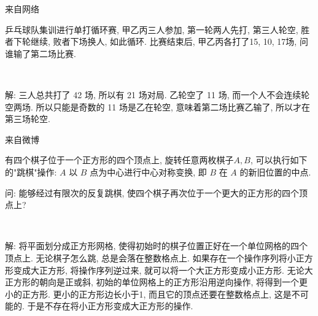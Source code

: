 \newpage
\noindent 来自网络

乒乓球队集训进行单打循环赛, 甲乙丙三人参加, 第一轮两人先打, 第三人轮空, 胜者下轮继续, 败者下场换人, 如此循环. 比赛结束后, 甲乙丙各打了15, 10, 17场, 问谁输了第二场比赛.

~

解: 三人总共打了 42 场, 所以有 21 场对局. 乙轮空了 11 场, 而一个人不会连续轮空两场. 所以只能是奇数的 11 场是乙在轮空, 意味着第二场比赛乙输了, 所以才在第三场轮空.



\newpage
\noindent 来自微博

有四个棋子位于一个正方形的四个顶点上, 旋转任意两枚棋子$A,B$, 可以执行如下的"跳棋"操作: $A$ 以 $B$ 点为中心进行中心对称变换, 即 $B$ 在 $A$ 的新旧位置的中点.

问: 能够经过有限次的反复跳棋, 使四个棋子再次位于一个更大的正方形的四个顶点上?

~

解: 将平面划分成正方形网格, 使得初始时的棋子位置正好在一个单位网格的四个顶点上. 无论棋子怎么跳, 总是会落在整数格点上. 如果存在一个操作序列将小正方形变成大正方形, 将操作序列逆过来, 就可以将一个大正方形变成小正方形. 无论大正方形的朝向是正或斜, 初始的单位网格上的正方形沿用逆向操作, 将得到一个更小的正方形. 更小的正方形边长小于1, 而且它的顶点还要在整数格点上, 这是不可能的. 于是不存在将小正方形变成大正方形的操作.







































